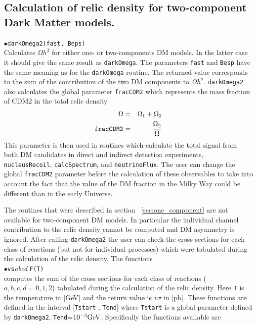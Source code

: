 \documentclass[12pt,a4paper]{article}
\begin{document}
\subsection{Calculation of relic density for  two-component Dark Matter models.}


$\bullet$\verb|darkOmega2(fast, Beps)|\\
Calculates $\Omega h^2$ for either  one- or  two-components DM models. In the latter case it should give the same result as \verb|darkOmega|.
The parameters {\tt fast} and {\tt Besp} have the same meaning as for the {\tt darkOmega} routine.
The returned value corresponds to the sum of the contribution of the two  DM components to  $\Omega h^2$.  
 \verb|darkOmega2| also calculates the  global parameter {\tt fracCDM2} which represents the mass fraction of CDM2 
in the total relic density
\begin{eqnarray}
  \Omega &=& \Omega_1+\Omega_2\\
  \verb|fracCDM2|&=&\frac{\Omega_2}{\Omega}
\end{eqnarray}
This parameter is then used in routines which calculate the total signal from both  DM candidates in direct and indirect detection experiments,
 \verb|nucleusRecoil|, \verb|calcSpectrum|,  and \verb|neutrinoFlux|.  The user can change the global {\tt  fracCDM2} parameter before the calculation of these observables
to take into account the fact that the value of the DM fraction in the Milky Way could be different than   in the early Universe.

The routines that were described in section ~\ref{sec:one_component} are not available for two-component DM models. In particular the individual channel contribution to the relic density cannot be computed and DM asymmetry is ignored. 
 After calling  {\tt  darkOmega2}  the user can check the  cross sections  
for each class of reactions (but not for individual processes) which were tabulated during the calculation of the relic density. 
The functions\\
$\bullet$\verb|vs|{\it abcd} \verb|F(T)|\\
computes the sum of  the cross sections  
for each class of reactions ($a,b,c,d=0,1,2$) tabulated during the calculation of the relic density. 
Here  \verb|T| is the temperature in [GeV] and the 
return value is $v\sigma$ in [pb].  These functions are defined in the interval [{\tt Tstart} , {\tt Tend}] where
{\tt Tstart} is a global parameter defined by \verb|darkOmega2|, {\tt Tend}=$10^{-3}{\rm GeV}$. Specifically the functions available are
\end{document}
